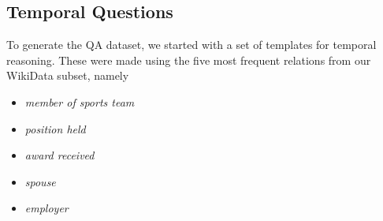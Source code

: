 \documentclass[11pt,a4paper]{article}
\begin{document}
\begin{table}[t!]
\caption{Number of questions in our dataset across different types of reasoning required and different answer types. Please refer to Section~\ref{sec:question-categorization} for details.}
\label{tab:dataset-stats-questions}
\end{table}













\subsection{Temporal Questions}
\label{sec:making-temporal-questions}

To generate the QA dataset, we started with a set of templates for temporal reasoning. These were made using the five most frequent relations from our WikiData subset, namely 
\begin{itemize}
    \item \textit{member of sports team}
    \item \textit{position held}
    \item \textit{award received}
    \item \textit{spouse}
    \item \textit{employer}
\end{itemize}
\end{document}
